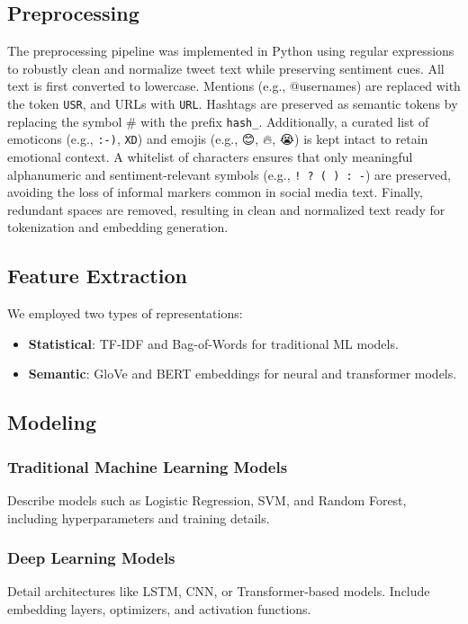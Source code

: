\documentclass[10pt]{article}
\begin{document}
\subsection{Preprocessing}
The preprocessing pipeline was implemented in Python using regular expressions to robustly clean and normalize tweet text while preserving sentiment cues.
All text is first converted to lowercase. Mentions (e.g., @usernames) are replaced with the token \texttt{USR}, and URLs with \texttt{URL}.
Hashtags are preserved as semantic tokens by replacing the symbol \# with the prefix \texttt{hash\_}.
Additionally, a curated list of emoticons (e.g., \texttt{:-)}, \texttt{XD}) and emojis (e.g., 😊, 🔥, 😭) is kept intact to retain emotional context.
A whitelist of characters ensures that only meaningful alphanumeric and sentiment-relevant symbols (e.g., \texttt{! ? ( ) : -}) are preserved, avoiding the loss of informal markers common in social media text.
Finally, redundant spaces are removed, resulting in clean and normalized text ready for tokenization and embedding generation.

\subsection{Feature Extraction} %
We employed two types of representations:
\begin{itemize}
    \item \textbf{Statistical}: TF-IDF and Bag-of-Words for traditional ML models.
    \item \textbf{Semantic}: GloVe and BERT embeddings for neural and transformer models.
\end{itemize}

\subsection{Modeling} %
\subsubsection{Traditional Machine Learning Models} %
Describe models such as Logistic Regression, SVM, and Random Forest, including hyperparameters and training details.

\subsubsection{Deep Learning Models} %
Detail architectures like LSTM, CNN, or Transformer-based models. Include embedding layers, optimizers, and activation functions.
\end{document}
